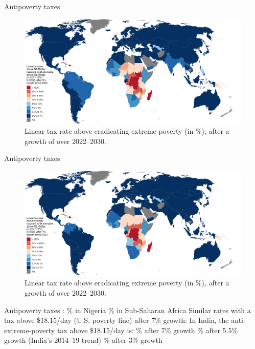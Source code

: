 \documentclass[aspectratio=169,xcolor=dvipsnames, 11pt,mathserif]{beamer}
\begin{document}
\begin{frame}{Antipoverty taxes}    
    \begin{figure}
      \caption{Linear tax rate above  eradicating extreme poverty (in \%), after a growth of  over 2022--2030. 
      }
      \includegraphics[height=.85\textheight]{../figures/antipoverty_2_tax_7_average.pdf}
    \end{figure}
\end{frame}

\begin{frame}{Antipoverty taxes}    
    \begin{figure}
      \caption{Linear tax rate above  eradicating extreme poverty (in \%), after a growth of  over 2022--2030. 
      }
      \includegraphics[height=.85\textheight]{../figures/antipoverty_2_tax_18_very_optimistic.pdf}
    \end{figure}
\end{frame}

\begin{frame}{Antipoverty taxes}   
    \bbsp 
    \ip {}:
    \bbvsp {}\% in Nigeria 
     \% in Sub-Saharan Africa
     \ip {}
     \ee
    \ip Similar rates with a tax above \$18.15/day (U.S. poverty line) after 7\% growth:
    \ip In India, the anti-extreme-poverty tax above \$18.15/day is:
    \bbvsp {}\% after 7\% growth
      \% after 5.5\% growth (India's 2014--19 trend)
      \% after 3\% growth
    \ee
    \ee 
\end{frame}
\end{document}

